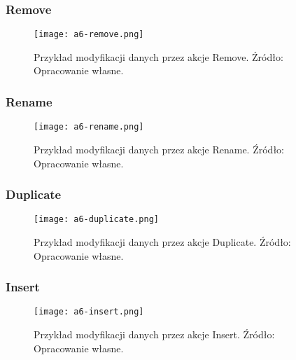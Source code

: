 \subsubsection{Remove}
\begin{figure}[!h]
    \centering \texttt{[image: a6-remove.png]}
    \caption{Przykład modyfikacji danych przez akcje Remove. Źródło: Opracowanie własne.}\label{fig:a6-remove}
\end{figure}
\subsubsection{Rename}
\begin{figure}[!h]
    \centering \texttt{[image: a6-rename.png]}
    \caption{Przykład modyfikacji danych przez akcje Rename. Źródło: Opracowanie własne.}\label{fig:a6-rename}
\end{figure}
\subsubsection{Duplicate}
\begin{figure}[!h]
    \centering \texttt{[image: a6-duplicate.png]}
    \caption{Przykład modyfikacji danych przez akcje Duplicate. Źródło: Opracowanie własne.}\label{fig:a6-duplicate}
\end{figure}
\subsubsection{Insert}
\begin{figure}[!h]
    \centering \texttt{[image: a6-insert.png]}
    \caption{Przykład modyfikacji danych przez akcje Insert. Źródło: Opracowanie własne.}\label{fig:a6-duplicate}
\end{figure}